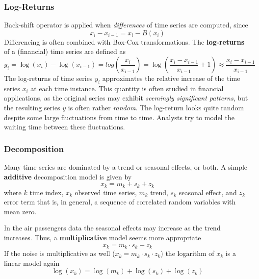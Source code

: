 \documentclass[11pt]{article}
\theoremstyle{definition}
\begin{document}
\subsubsection{Log-Returns}
Back-shift operator is applied when \emph{differences} of time series are computed, since
\begin{equation*}
	x_i - x_{i-1} = x_i - B(x_i)
\end{equation*}
Differencing is often combined with Box-Cox transformations. The \textbf{log-returns} of a (financial) time series are defined as
\begin{equation*}
	y_i = \log(x_i) - \log (x_{i-1}) = log\left(\frac{x_i}{x_{i-1}}\right) = \log\left(\frac{x_i - x_{i-1}}{x_{i-1}} + 1\right) \approx \frac{x_i - x_{i-1}}{x_{i-1}}
\end{equation*}
The log-returns of time series $y_i$ approximates the relative increase of the time series $x_i$ at each time instance. This quantity is often studied in financial applications, as the original series may exhibit \emph{seemingly significant patterns}, but the resulting series $y$ is often rather \emph{random}. The log-return looks quite random despite some large fluctuations from time to time. Analysts try to model the waiting time between these fluctuations.

\subsubsection{Decomposition}
Many time series are dominated by a trend or seasonal effects, or both. A simple \textbf{additive} decomposition model is given by
\begin{equation*}
	x_k = m_k + s_k + z_k
\end{equation*}
where $k$ time index, $x_k$ observed time series, $m_k$ trend, $s_k$ seasonal effect, and $z_k$ error term that is, in general, a sequence of correlated random variables with mean zero.

In the air passengers data the seasonal effects may increase as the trend increases. Thus, a \textbf{multiplicative} model seems more appropriate
\begin{equation*}
	x_k = m_k \cdot s_k + z_k
\end{equation*}
If the noise is multiplicative as well ($x_k = m_k \cdot s_k \cdot z_k$) the logarithm of $x_k$ is a linear model again
\begin{equation*}
	\log(x_k) = \log(m_k) + \log(s_k) + \log(z_k)
\end{equation*}
\end{document}
